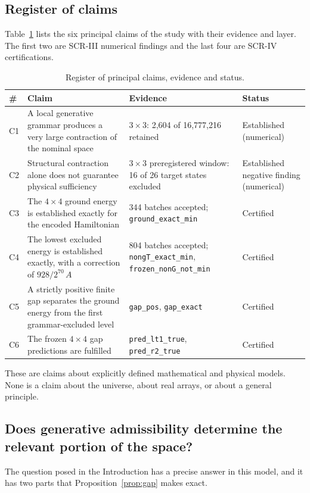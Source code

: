 \documentclass[11pt,a4paper]{article}
\theoremstyle{plain}
\theoremstyle{definition}
\theoremstyle{remark}
\newcommand{\lean}[1]{\nolinkurl{#1}}
\begin{document}
\subsection{Register of claims}
Table~\ref{tab:claims} lists the six principal claims of the study with their evidence and layer. The first two are SCR-III numerical findings and the last four are SCR-IV certifications.

\begin{table}[t]
\centering\small
\caption{Register of principal claims, evidence and status.}
\label{tab:claims}
\begin{tabularx}{\linewidth}{@{}p{0.9cm}p{4.7cm}Xp{2.2cm}@{}}
\toprule
\# & Claim & Evidence & Status\\
\midrule
C1 & A local generative grammar produces a very large contraction of the nominal space & $3\times3$: 2{,}604 of 16{,}777{,}216 retained & Established (numerical)\\[0.3em]
C2 & Structural contraction alone does not guarantee physical sufficiency & $3\times3$ preregistered window: 16 of 26 target states excluded & Established negative finding (numerical)\\[0.3em]
C3 & The $4\times4$ ground energy is established exactly for the encoded Hamiltonian & 344 batches accepted; \lean{ground_exact_min} & Certified\\[0.3em]
C4 & The lowest excluded energy is established exactly, with a correction of $928/2^{70}\,A$ & 804 batches accepted; \lean{nongT_exact_min}, \lean{frozen_nonG_not_min} & Certified\\[0.3em]
C5 & A strictly positive finite gap separates the ground energy from the first grammar-excluded level & \lean{gap_pos}, \lean{gap_exact} & Certified\\[0.3em]
C6 & The frozen $4\times4$ gap predictions are fulfilled & \lean{pred_lt1_true}, \lean{pred_r2_true} & Certified\\
\bottomrule
\end{tabularx}
\end{table}

These are claims about explicitly defined mathematical and physical models. None is a claim about the universe, about real arrays, or about a general principle.

\subsection{Does generative admissibility determine the relevant portion of the space?}
The question posed in the Introduction has a precise answer in this model, and it has two parts that Proposition~\ref{prop:gap} makes exact.
\end{document}
